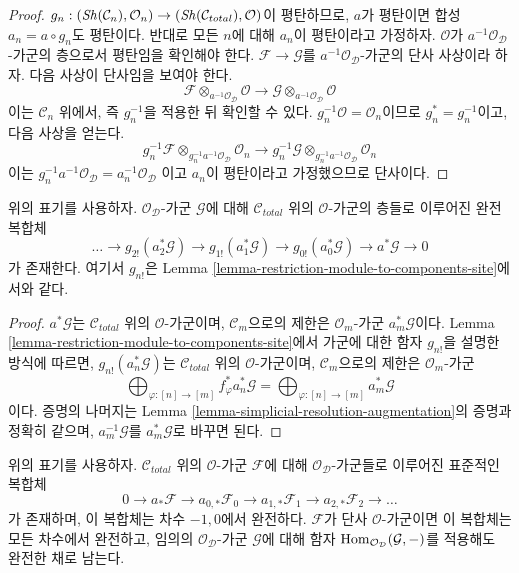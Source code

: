 \begin{proof}
$g_n : (\mathop{\mathit{Sh}}\nolimits(\mathcal{C}_n), \mathcal{O}_n) \to
(\mathop{\mathit{Sh}}\nolimits(\mathcal{C}_{total}), \mathcal{O})$이 평탄하므로,
$a$가 평탄이면 합성 $a_n = a \circ g_n$도 평탄이다.
반대로 모든 $n$에 대해 $a_n$이 평탄이라고 가정하자.
$\mathcal{O}$가 $a^{-1}\mathcal{O}_\mathcal{D}$-가군의 층으로서
평탄임을 확인해야 한다. $\mathcal{F} \to \mathcal{G}$를
$a^{-1}\mathcal{O}_\mathcal{D}$-가군의 단사 사상이라 하자.
다음 사상이 단사임을 보여야 한다.
$$
\mathcal{F} \otimes_{a^{-1}\mathcal{O}_\mathcal{D}} \mathcal{O}
\to
\mathcal{G} \otimes_{a^{-1}\mathcal{O}_\mathcal{D}} \mathcal{O}
$$
이는 $\mathcal{C}_n$ 위에서, 즉 $g_n^{-1}$을 적용한 뒤 확인할 수 있다.
$g_n^{-1}\mathcal{O} = \mathcal{O}_n$이므로
$g_n^* = g_n^{-1}$이고, 다음 사상을 얻는다.
$$
g_n^{-1}\mathcal{F} \otimes_{g_n^{-1}a^{-1}\mathcal{O}_\mathcal{D}}
\mathcal{O}_n
\to
g_n^{-1}\mathcal{G} \otimes_{g_n^{-1}a^{-1}\mathcal{O}_\mathcal{D}}
\mathcal{O}_n
$$
이는
$g_n^{-1}a^{-1}\mathcal{O}_\mathcal{D} = a_n^{-1}\mathcal{O}_\mathcal{D}$
이고 $a_n$이 평탄이라고 가정했으므로 단사이다.
\end{proof}

\begin{lemma}
\label{lemma-simplicial-resolution-augmentation-modules}
위의 표기를 사용하자. $\mathcal{O}_\mathcal{D}$-가군
$\mathcal{G}$에 대해 $\mathcal{C}_{total}$ 위의
$\mathcal{O}$-가군의 층들로 이루어진 완전 복합체
$$
\ldots \to
g_{2!}(a_2^*\mathcal{G}) \to
g_{1!}(a_1^*\mathcal{G}) \to
g_{0!}(a_0^*\mathcal{G}) \to
a^*\mathcal{G} \to 0
$$
가 존재한다. 여기서 $g_{n!}$은 Lemma
\ref{lemma-restriction-module-to-components-site}에서와 같다.
\end{lemma}

\begin{proof}
$a^*\mathcal{G}$는 $\mathcal{C}_{total}$ 위의
$\mathcal{O}$-가군이며, $\mathcal{C}_m$으로의 제한은
$\mathcal{O}_m$-가군 $a_m^*\mathcal{G}$이다.
Lemma \ref{lemma-restriction-module-to-components-site}에서
가군에 대한 함자 $g_{n!}$을 설명한 방식에 따르면,
$g_{n!}(a_n^*\mathcal{G})$는 $\mathcal{C}_{total}$ 위의
$\mathcal{O}$-가군이며, $\mathcal{C}_m$으로의 제한은
$\mathcal{O}_m$-가군
$$
\bigoplus\nolimits_{\varphi : [n] \to [m]} f_\varphi^*a_n^*\mathcal{G} =
\bigoplus\nolimits_{\varphi : [n] \to [m]} a_m^*\mathcal{G}
$$
이다. 증명의 나머지는 Lemma
\ref{lemma-simplicial-resolution-augmentation}의 증명과 정확히 같으며,
$a_m^{-1}\mathcal{G}$를 $a_m^*\mathcal{G}$로 바꾸면 된다.
\end{proof}

\begin{lemma}
\label{lemma-augmentation-cech-complex-modules}
위의 표기를 사용하자. $\mathcal{C}_{total}$ 위의
$\mathcal{O}$-가군 $\mathcal{F}$에 대해
$\mathcal{O}_\mathcal{D}$-가군들로 이루어진 표준적인 복합체
$$
0 \to a_*\mathcal{F} \to a_{0, *}\mathcal{F}_0 \to a_{1, *}\mathcal{F}_1 \to
a_{2, *}\mathcal{F}_2 \to \ldots
$$
가 존재하며, 이 복합체는 차수 $-1, 0$에서 완전하다.
$\mathcal{F}$가 단사 $\mathcal{O}$-가군이면 이 복합체는 모든 차수에서
완전하고, 임의의 $\mathcal{O}_\mathcal{D}$-가군 $\mathcal{G}$에 대해
함자 $\mathop{\mathrm{Hom}}\nolimits_{\mathcal{O}_\mathcal{D}}(\mathcal{G}, -)$를 적용해도
완전한 채로 남는다.
\end{lemma}

